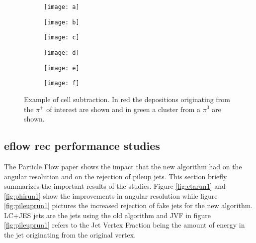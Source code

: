 \begin{figure}[htbp]
  \centering
  \begin{subfigure}[b]{0.3\figwidth}
    \texttt{[image: a]}
    \caption{}\label{fig:sub-a}
  \end{subfigure}
  \begin{subfigure}[b]{0.3\figwidth}
    \texttt{[image: b]}
    \caption{}\label{fig:sub-b}
  \end{subfigure}
  \begin{subfigure}[b]{0.3\figwidth}
    \texttt{[image: c]}
    \caption{}\label{fig:sub-c}
  \end{subfigure}
  \begin{subfigure}[b]{0.3\figwidth}
    \texttt{[image: d]}
    \caption{}\label{fig:sub-d}
  \end{subfigure}
    
    
  \begin{subfigure}[b]{0.3\figwidth}
        \texttt{[image: e]}
        \caption{}\label{fig:sub-e}
  \end{subfigure}
  \begin{subfigure}[b]{0.3\figwidth}
        \texttt{[image: f]}
        \caption{}\label{fig:sub-f}
  \end{subfigure}
  \caption{Example of cell subtraction. In red the depositions originating from the $\pi ^+$ of interest are shown and in green a cluster from a $\pi ^0$ are shown. \cite{pflow16}}
  \label{fig:sub}
\end{figure}


\subsection{eflow rec performance studies}

The Particle Flow paper shows the impact that the new algorithm had on the angular resolution and on the rejection of pileup jets. This section briefly summarizes the important results of the studies. Figure \ref{fig:etarun1} and \ref{fig:phirun1} show the improvements in angular resolution while figure \ref{fig:pileuprun1} pictures the increased rejection of fake jets for the new algorithm. LC+JES jets are the jets using the old algorithm and JVF in figure \ref{fig:pileuprun1} refers to the Jet Vertex Fraction being the amount of energy in the jet originating from the original vertex.

